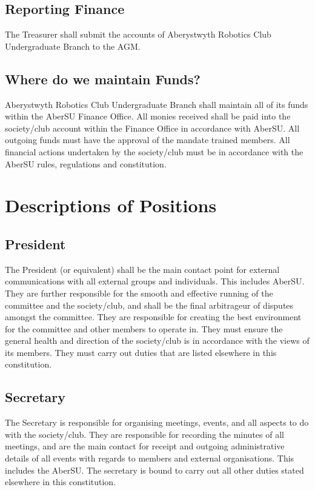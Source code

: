 \documentclass[a4paper,11pt]{article}
\begin{document}
\subsection{Reporting Finance}
The Treasurer shall submit the accounts of Aberystwyth Robotics Club Undergraduate Branch to the AGM.

\subsection{Where do we maintain Funds?}
Aberystwyth Robotics Club Undergraduate Branch shall maintain all of its funds within the AberSU Finance Office. All monies received shall be paid into the society/club account within the Finance Office in accordance with AberSU. All outgoing funds must have the approval of the mandate trained members.\newline
All financial actions undertaken by the society/club must be in accordance with the AberSU rules, regulations and constitution.

\section{Descriptions of Positions}
\subsection{President}
The President (or equivalent) shall be the main contact point for external communications with
all external groups and individuals. This includes AberSU. They are further responsible for the smooth and effective running of the committee and the society/club, and shall be the final arbitrageur of disputes amongst the committee. They are responsible for creating the best environment for the committee and other members to operate in. They must ensure the general health and direction of the society/club is in accordance with the views of its members. They must carry out duties that are listed elsewhere in this constitution.

\subsection{Secretary}
The Secretary is responsible for organising meetings, events, and all aspects to do with the society/club. They are responsible for recording the minutes of all meetings, and are the main contact for receipt and outgoing administrative details of all events with regards to members and external organisations. This includes the AberSU. The secretary is bound to carry out all other duties stated elsewhere in this constitution.
\end{document}
